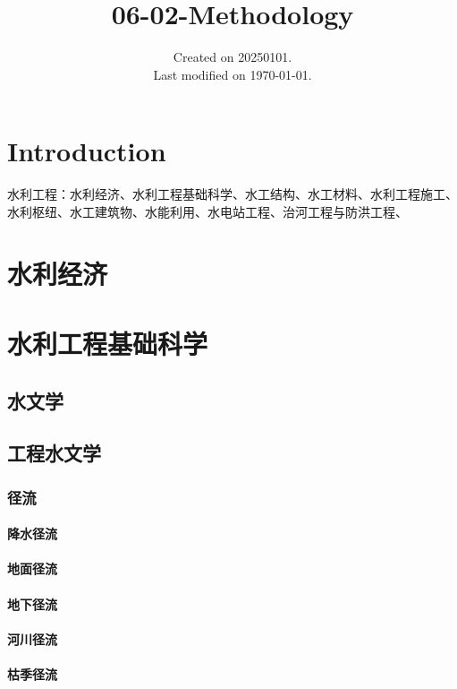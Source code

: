 \documentclass[UTF8]{../../ApplicationUniverse}
\begin{document}
\title{06-02-Methodology}
\date{Created on 20250101.\\   Last modified on \today.}
\maketitle
\tableofcontents


\chapter{Introduction}
水利工程：水利经济、水利工程基础科学、水工结构、水工材料、水利工程施工、水利枢纽、水工建筑物、水能利用、水电站工程、治河工程与防洪工程、





\chapter{水利经济}


\chapter{水利工程基础科学}
\section{水文学}
\section{工程水文学}
    \subsection{径流}
        \subsubsection{降水径流}
        \subsubsection{地面径流}
        \subsubsection{地下径流}
        \subsubsection{河川径流}
        \subsubsection{枯季径流}
\end{document}
